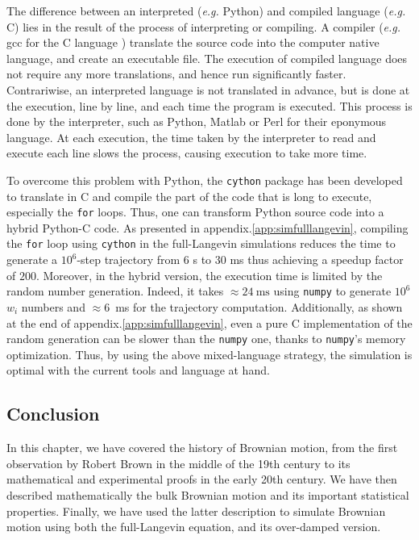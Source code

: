 The difference between an interpreted (\textit{e.g.} Python) and compiled language (\textit{e.g.} C) lies in the result of the process of interpreting or compiling. A compiler (\textit{e.g.} gcc for the C language \href{https://github.com/gcc-mirror/gcc}{\faGithub}) translate the source code into the computer native language, and create an executable file. The execution of compiled language does not require any more translations, and hence run significantly faster. Contrariwise, an interpreted language is not translated in advance, but is done at the execution, line by line, and each time the program is executed. This process is done by the interpreter, such as Python, Matlab or Perl for their eponymous language. At each execution, the time taken by the interpreter to read and execute each line slows the process, causing execution to take more time.

To overcome this problem with Python, the \texttt{cython} package has been developed to translate in C and compile the part of the code that is long to execute, especially the \texttt{for} loops. Thus, one can transform Python source code into a hybrid Python-C code. As presented in appendix.\ref{app:simfulllangevin}, compiling the \texttt{for} loop using \texttt{cython} in the full-Langevin simulations reduces the time to generate a $10^6$-step trajectory from $6$ s to $30$ ms thus achieving a speedup  factor of $200$. Moreover, in the hybrid version, the execution time is limited by the random number generation. Indeed, it takes $ \approx 24 ~ \mathrm{ms}$ using \texttt{numpy} to generate $10^6$ $w_i$ numbers and $\approx 6$~ms for the trajectory computation. Additionally, as shown at the end of appendix.\ref{app:simfulllangevin}, even a pure C implementation of the random generation can be slower than the \texttt{numpy} one, thanks to  \texttt{numpy}'s memory optimization. Thus, by using the above mixed-language strategy, the simulation is optimal with the current tools and language at hand.

\subsection{Conclusion}

In this chapter, we have covered the history of Brownian motion, from the first observation by Robert Brown in the middle of the 19th century to its mathematical and experimental proofs in the early 20th century. We have then described mathematically the bulk Brownian motion and its important statistical properties. Finally, we have used the latter description to simulate Brownian motion using both the full-Langevin equation, and its over-damped version. 
